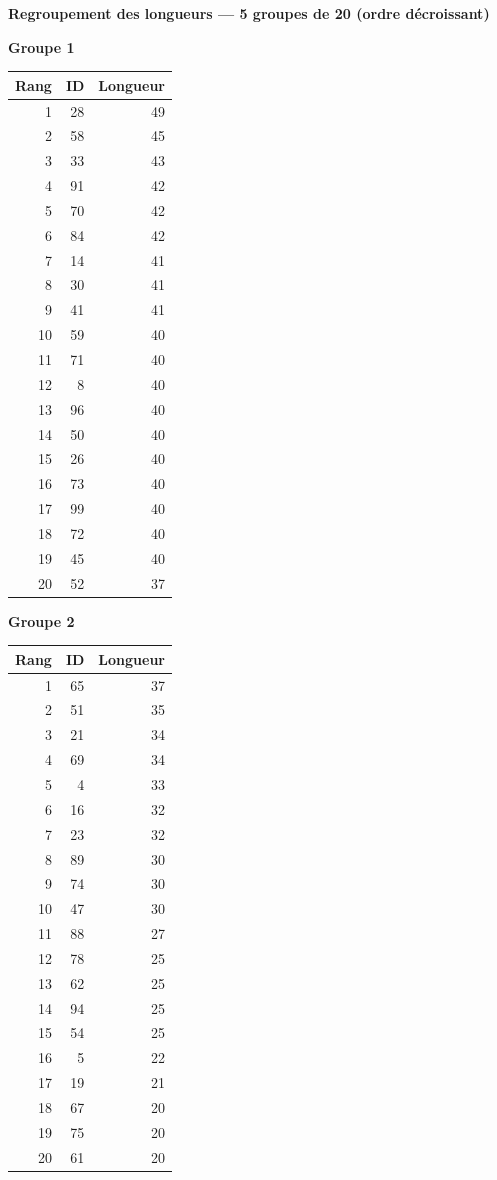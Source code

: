 \documentclass[10pt]{article}
\begin{document}
{\large \textbf{Regroupement des longueurs — 5 groupes de 20 (ordre décroissant)}}\\[0.5em]
\begin{minipage}[t]{0.31\textwidth}
\centering
\small
\textbf{Groupe 1}\\[-0.25em]
\begin{tabular}{@{}r r r@{}}
\toprule
Rang & ID & Longueur \\
\midrule
1 & 28 & 49 \\
2 & 58 & 45 \\
3 & 33 & 43 \\
4 & 91 & 42 \\
5 & 70 & 42 \\
6 & 84 & 42 \\
7 & 14 & 41 \\
8 & 30 & 41 \\
9 & 41 & 41 \\
10 & 59 & 40 \\
11 & 71 & 40 \\
12 & 8 & 40 \\
13 & 96 & 40 \\
14 & 50 & 40 \\
15 & 26 & 40 \\
16 & 73 & 40 \\
17 & 99 & 40 \\
18 & 72 & 40 \\
19 & 45 & 40 \\
20 & 52 & 37 \\
\bottomrule
\end{tabular}
\end{minipage} 
\hfill
 \begin{minipage}[t]{0.31\textwidth}
\centering
\small
\textbf{Groupe 2}\\[-0.25em]
\begin{tabular}{@{}r r r@{}}
\toprule
Rang & ID & Longueur \\
\midrule
1 & 65 & 37 \\
2 & 51 & 35 \\
3 & 21 & 34 \\
4 & 69 & 34 \\
5 & 4 & 33 \\
6 & 16 & 32 \\
7 & 23 & 32 \\
8 & 89 & 30 \\
9 & 74 & 30 \\
10 & 47 & 30 \\
11 & 88 & 27 \\
12 & 78 & 25 \\
13 & 62 & 25 \\
14 & 94 & 25 \\
15 & 54 & 25 \\
16 & 5 & 22 \\
17 & 19 & 21 \\
18 & 67 & 20 \\
19 & 75 & 20 \\
20 & 61 & 20 \\
\bottomrule
\end{tabular}
\end{minipage} 
\end{document}
